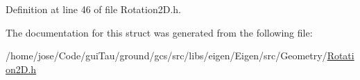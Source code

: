 Definition at line 46 of file Rotation2\-D.\-h.



The documentation for this struct was generated from the following file\-:\begin{DoxyCompactItemize}
\item 
/home/jose/\-Code/gui\-Tau/ground/gcs/src/libs/eigen/\-Eigen/src/\-Geometry/\hyperlink{_rotation2_d_8h}{Rotation2\-D.\-h}\end{DoxyCompactItemize}
